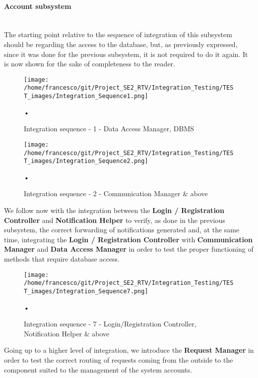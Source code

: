 \documentclass[10pt, a4paper,titlepage]{article}
\begin{document}
\paragraph{Account subsystem}\mbox{}\\
The starting point relative to the sequence of integration of this subsystem should be regarding the access to the database, but, as previously expressed, since it was done for the previous subsystem, it is not required to do it again. It is now shown for the sake of completeness to the reader.
\begin{figure}[h]
\begin{center}
\texttt{[image: /home/francesco/git/Project\_SE2\_RTV/Integration\_Testing/TEST\_images/Integration\_Sequence1.png]}
\caption{Integration sequence - 1 - Data Access Manager, DBMS}
\label{fig:int_seq1_1}
\end{center}•
\end{figure}
\begin{figure}[h]
\begin{center}
\texttt{[image: /home/francesco/git/Project\_SE2\_RTV/Integration\_Testing/TEST\_images/Integration\_Sequence2.png]}
\caption{Integration sequence - 2 - Communication Manager \& above}
\label{fig:int_seq2_1}
\end{center}•
\end{figure}
\pagebreak
We follow now with the integration between the \textbf{Login / Registration Controller} and \textbf{Notification Helper} to verify, as done in the previous subsystem, the correct forwarding of notifications generated and, at the same time, integrating  the \textbf{Login / Registration Controller} with \textbf{Communication Manager} and \textbf{Data Access Manager} in order to test the proper functioning of methods that require database access.
\begin{figure}[h]
\begin{center}
\texttt{[image: /home/francesco/git/Project\_SE2\_RTV/Integration\_Testing/TEST\_images/Integration\_Sequence7.png]}
\caption{Integration sequence - 7 - Login/Registration Controller, Notification Helper \& above}
\label{fig:int_seq7}
\end{center}•
\end{figure}
Going up to a higher level of integration, we introduce the \textbf{Request Manager} in order to test the correct routing of requests coming from the outside to the component suited to the management of the system accounts.
\end{document}

